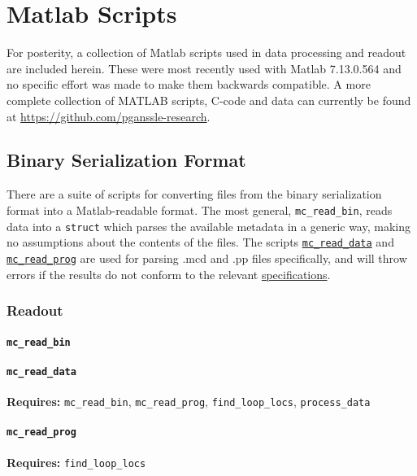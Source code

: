 \documentclass[../PaulGanssle-Thesis.tex]{subfiles}
\begin{document}
\chapter{Matlab Scripts}
\label{matlab.scripts}
\lstset{style=mat,xleftmargin=0em,basicstyle=\ttfamily\scriptsize}
For posterity, a collection of Matlab scripts used in data processing and readout are included herein. These were most recently used with Matlab 7.13.0.564 and no specific effort was made to make them backwards compatible. A more complete collection of MATLAB scripts, C-code and data can currently be found at \href{https://github.com/pganssle-research}{https://github.com/pganssle-research}.

\section{Binary Serialization Format}
\label{matlab.scripts.bsf}
There are a suite of scripts for converting files from the binary serialization format into a Matlab-readable format. The most general, \texttt{mc\_read\_bin}, reads data into a \lstinline|struct| which parses the available metadata in a generic way, making no assumptions about the contents of the files. The scripts \hyperlink{matlab.scripts.bsf.mcreaddata}{\texttt{mc\_read\_data}} and \hyperlink{matlab.scripts.bsf.mcreaddata}{\texttt{mc\_read\_prog}} are used for parsing .mcd and .pp files specifically, and will throw errors if the results do not conform to the relevant \hyperlink{console.software.bin.spec}{specifications}.
\subsection{Readout}
\subsubsection{\texttt{mc\_read\_bin}}
\label{matlab.scripts.bsf.mcreadbin}


\subsubsection{\texttt{mc\_read\_data}}
\textbf{Requires:} \texttt{mc\_read\_bin}, \texttt{mc\_read\_prog}, \texttt{find\_loop\_locs}, \texttt{process\_data}
\label{matlab.scripts.bsf.mcreaddata}


\subsubsection{\texttt{mc\_read\_prog}}
\textbf{Requires:} \texttt{find\_loop\_locs}
\label{matlab.scripts.bsf.mcreadprog}

\end{document}
